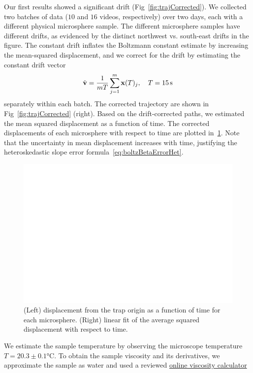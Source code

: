 \documentclass[aps,prb,twocolumn,superscriptaddress,floatfix,longbibliography,citeautoscript]{revtex4-2}
\begin{document}
Our first results showed a significant drift (Fig~\ref{fig:trajCorrected}). We collected two batches of data ($10$ and $16$ videos, respectively) over two days, each with a different physical microsphere sample. The different microsphere samples have different drifts, as evidenced by the distinct northwest vs. south-east drifts in the figure. The constant drift inflates the Boltzmann constant estimate by increasing the mean-squared displacement, and we correct for the drift by estimating the constant drift vector 
\[ 
    \hat{\mathbf v} = \dfrac 1 {mT} \sum_{j=1}^m \mathbf{x}(T)_j, \quad T=\SI{15}{\second} 
\]
separately within each batch. The corrected trajectory are shown in Fig~\ref{fig:trajCorrected} (right). Based on the drift-corrected paths, we estimated the mean squared displacement as a function of time. The corrected displacements of each microsphere with respect to time are plotted in~\ref{fig:dispCorrected}. Note that the uncertainty in mean displacement increases with time, justifying the heteroskedastic slope error formula~\ref{eq:boltzBetaErrorHet}. 
\begin{figure}
    \centering
    \includegraphics[width=1\linewidth]{./figs/displacements.png}
    \caption{(Left) displacement from the trap origin as a function of time for each microsphere.  (Right) linear fit of the average squared displacement with respect to time. }
    \label{fig:dispCorrected}
\end{figure}
We estimate the sample temperature by observing the microscope temperature 
$T=20.3\pm 0.1\si{\degreeCelsius}$. To obtain the sample viscosity and its derivatives, we approximate the sample as water and 
used a reviewed \href{https://www.omnicalculator.com/physics/water-viscosity}{online viscosity calculator}
\end{document}
